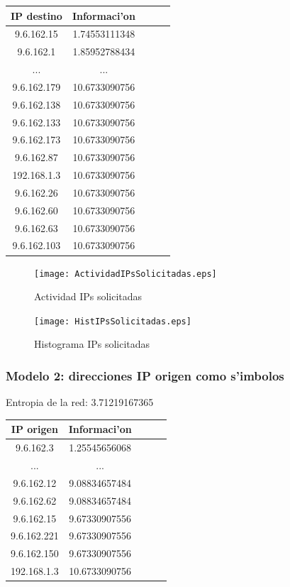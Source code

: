 \documentclass[a4paper,10pt]{article}
\begin{document}
\noindent \begin{tabular}{| c | c | c | c | r} \hline
IP destino	&	Informaci'on	\\	\hline
9.6.162.15	 & 	1.74553111348	 \\ \hline 
9.6.162.1	 & 	1.85952788434	 \\ \hline 
...	&	...	\\ \hline
9.6.162.179	 & 	10.6733090756	 \\ \hline 
9.6.162.138	 & 	10.6733090756	 \\ \hline 
9.6.162.133	 & 	10.6733090756	 \\ \hline 
9.6.162.173	 & 	10.6733090756	 \\ \hline 
9.6.162.87	 & 	10.6733090756	 \\ \hline 
192.168.1.3	 & 	10.6733090756	 \\ \hline 
9.6.162.26	 & 	10.6733090756	 \\ \hline 
9.6.162.60	 & 	10.6733090756	 \\ \hline 
9.6.162.63	 & 	10.6733090756	 \\ \hline 
9.6.162.103	 & 	10.6733090756	 \\ \hline 
\end{tabular}

\newpage

\begin{figure}[!hbp]
\begin{center}
\texttt{[image: ActividadIPsSolicitadas.eps]}
\end{center}
\caption{Actividad IPs solicitadas} \label{figura2}
\end{figure}

\begin{figure}[!hbp]
\begin{center}
\texttt{[image: HistIPsSolicitadas.eps]}
\end{center}
\caption{Histograma IPs solicitadas} \label{figura3}
\end{figure}

\newpage

\subsubsection{Modelo 2: direcciones IP origen como s'imbolos}

Entropia de la red: 3.71219167365	\\

\noindent \begin{tabular}{| c | c | c | c | r} \hline
IP origen	&	Informaci'on	\\	\hline
9.6.162.3	 & 	1.25545656068	 \\ \hline 
...	&	...	\\ \hline
9.6.162.12	 & 	9.08834657484	 \\ \hline 
9.6.162.62	 & 	9.08834657484	 \\ \hline 
9.6.162.15	 & 	9.67330907556	 \\ \hline 
9.6.162.221	 & 	9.67330907556	 \\ \hline 
9.6.162.150	 & 	9.67330907556	 \\ \hline 
192.168.1.3	 & 	10.6733090756	 \\ \hline 
\end{tabular}	
\end{document}
